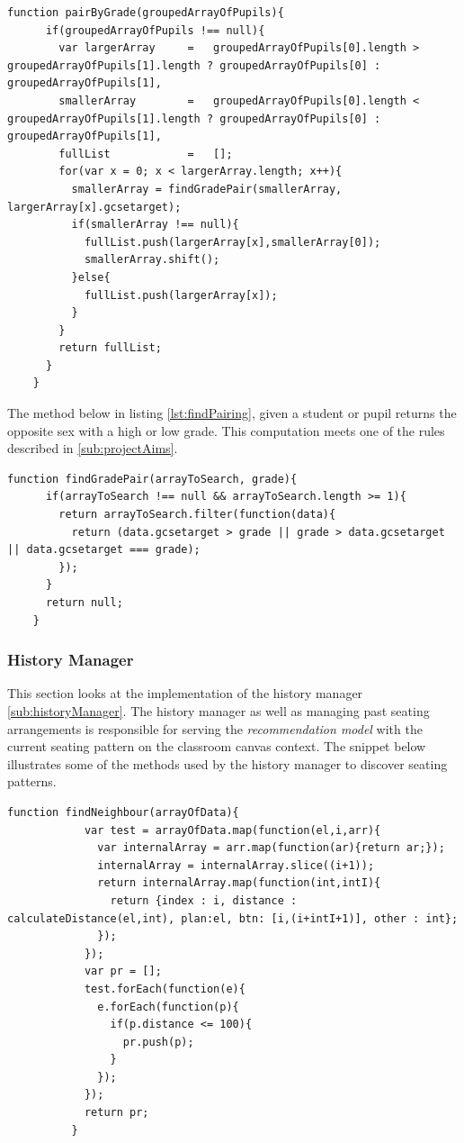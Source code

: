 \begin{lstlisting}[caption={Pair by grade}, label={lst:gradePairing}]
    function pairByGrade(groupedArrayOfPupils){
      if(groupedArrayOfPupils !== null){
        var largerArray     =   groupedArrayOfPupils[0].length > groupedArrayOfPupils[1].length ? groupedArrayOfPupils[0] : groupedArrayOfPupils[1],
        smallerArray        =   groupedArrayOfPupils[0].length < groupedArrayOfPupils[1].length ? groupedArrayOfPupils[0] : groupedArrayOfPupils[1],
        fullList            =   [];
        for(var x = 0; x < largerArray.length; x++){
          smallerArray = findGradePair(smallerArray, largerArray[x].gcsetarget);
          if(smallerArray !== null){
            fullList.push(largerArray[x],smallerArray[0]);
            smallerArray.shift();
          }else{
            fullList.push(largerArray[x]);
          }
        }
        return fullList;
      }
    }
\end{lstlisting}

The method below in listing \ref{lst:findPairing}, given a student or pupil returns the opposite sex with a high or low grade. This computation meets one of the rules described in \ref{sub:projectAims}. 

\begin{lstlisting}[caption={find grade pairing}, label={lst:findPairing}]
    function findGradePair(arrayToSearch, grade){
      if(arrayToSearch !== null && arrayToSearch.length >= 1){
        return arrayToSearch.filter(function(data){
          return (data.gcsetarget > grade || grade > data.gcsetarget || data.gcsetarget === grade);
        });
      }
      return null;
    }
\end{lstlisting}

\subsubsection{History Manager}
This section looks at the implementation of the history manager \ref{sub:historyManager}. The history manager as well as managing past seating arrangements is responsible for serving the \emph{recommendation model} with the current seating pattern on the classroom canvas context. The snippet below illustrates some of the methods used by the history manager to discover seating patterns.

\begin{lstlisting}[caption={Finds pairings}, label={lst:pairNeighbours}]
    function findNeighbour(arrayOfData){
            var test = arrayOfData.map(function(el,i,arr){
              var internalArray = arr.map(function(ar){return ar;});
              internalArray = internalArray.slice((i+1));
              return internalArray.map(function(int,intI){
                return {index : i, distance : calculateDistance(el,int), plan:el, btn: [i,(i+intI+1)], other : int};
              });
            });
            var pr = [];
            test.forEach(function(e){
              e.forEach(function(p){
                if(p.distance <= 100){
                  pr.push(p);
                }
              });
            });
            return pr;
          }
\end{lstlisting}

